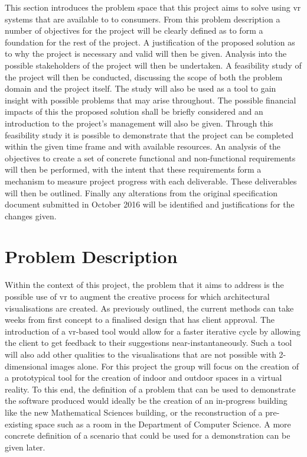 This section introduces the problem space that this project aims to solve using \acrshort{vr} systems that are available to to consumers. From this problem description a number of objectives for the project will be clearly defined as to form a foundation for the rest of the project. A justification of the proposed solution as to why the project is necessary and valid will then be given. Analysis into the possible stakeholders of the project will then be undertaken. A feasibility study of the project will then be conducted, discussing the scope of both the problem domain and the project itself. The study will also be used as a tool to gain insight with possible problems that may arise throughout. The possible financial impacts of this the proposed solution shall be briefly considered and an introduction to the project's management will also be given. Through this feasibility study it is possible to demonstrate that the project can be completed within the given time frame and with available resources. An analysis of the objectives to create a set of concrete functional and non-functional requirements will then be performed, with the intent that these requirements form a mechanism to measure project progress with each deliverable. These deliverables will then be outlined. Finally any alterations from the original specification document submitted in October 2016 will be identified and justifications for the changes given.


\section{Problem Description}

    Within the context of this project, the problem that it aims to address is the possible use of \acrshort{vr} to augment the creative process for which architectural visualisations are created. As previously outlined, the current methods can take weeks from first concept to a finalised design that has client approval. The introduction of a \acrshort{vr}-based tool would allow for a faster iterative cycle by allowing the client to get feedback to their suggestions near-instantaneously. Such a tool will also add other qualities to the visualisations that are not possible with 2-dimensional images alone. For this project the group will focus on the creation of a prototypical tool for the creation of indoor and outdoor spaces in a virtual reality. To this end, the definition of a problem that can be used to demonstrate the software produced would ideally be the creation of an in-progress building like the new Mathematical Sciences building, or the reconstruction of a pre-existing space such as a room in the Department of Computer Science. A more concrete definition of a scenario that could be used for a demonstration can be given later.
    
